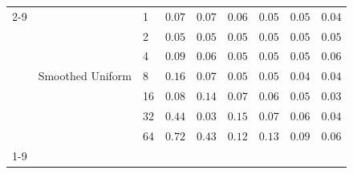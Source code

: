 \begin{tabular}{lllcccccc}
\cmidrule{2-9}
 & \multirow[l]{7}{*}{Smoothed Uniform} & 1 & $0.07$ & $0.07$ & $0.06$ & $0.05$ & $0.05$ & $0.04$ \\
 &  & 2 & $0.05$ & $0.05$ & $0.05$ & $0.05$ & $0.05$ & $0.05$ \\
 &  & 4 & $0.09$ & $0.06$ & $0.05$ & $0.05$ & $0.05$ & $0.06$ \\
 &  & 8 & $0.16$ & $0.07$ & $0.05$ & $0.05$ & $0.04$ & $0.04$ \\
 &  & 16 & $0.08$ & $0.14$ & $0.07$ & $0.06$ & $0.05$ & $0.03$ \\
 &  & 32 & $0.44$ & $0.03$ & $0.15$ & $0.07$ & $0.06$ & $0.04$ \\
 &  & 64 & $0.72$ & $0.43$ & $0.12$ & $0.13$ & $0.09$ & $0.06$ \\
\cmidrule{1-9} \bottomrule
\end{tabular}
